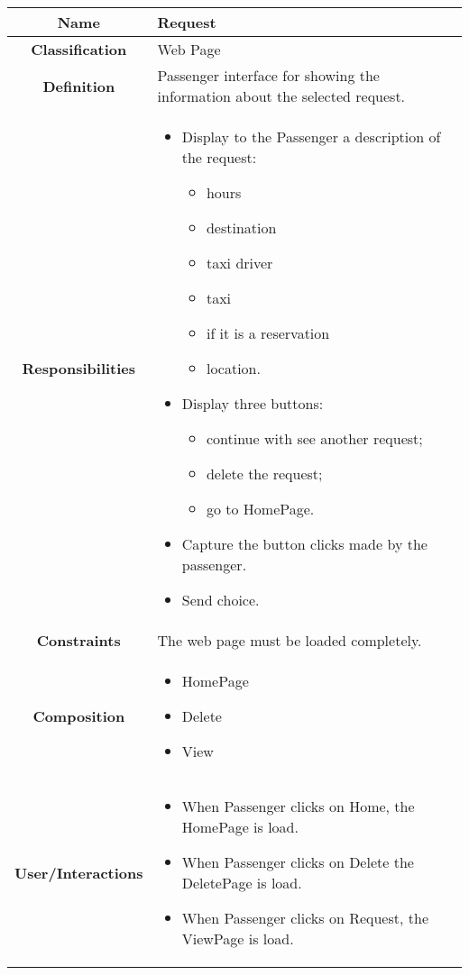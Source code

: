 \documentclass[11pt, a4paper,titlepage]{article}
\begin{document}
\begin{enumerate}
\begin{tabularx}{\textwidth}{| c | X |}
	\hline
	\textbf{Name} & 
	Request
	
	\\
	\hline
	\textbf{Classification} & 
	Web Page

	\\
	\hline
	\textbf{Definition} & 
	Passenger interface for showing the information about the selected request.

	\\
	\hline
	\textbf{Responsibilities} &
		\begin{itemize}
			\item Display to the Passenger a description of the request:
				\begin{itemize}
					\item hours
					\item destination
					\item taxi driver
					\item taxi 
					\item if it is a reservation 
					\item location.
				\end{itemize}
			\item Display three buttons:
			\begin{itemize}	
				\item continue with see another request;
				\item delete the request;
				\item go to HomePage.
			\end{itemize}
			\item Capture the button clicks made by the passenger.    
			\item Send choice.
		\end{itemize}
	
	\\
	\hline
	\textbf{Constraints} & 
	The web page must be loaded completely.
	
	\\
	\hline
	\textbf{Composition} & 
		\begin{itemize}
			\item HomePage
			\item Delete
			\item View
		\end{itemize}
	
	\\
	\hline
	\textbf{User/Interactions} & 
		\begin{itemize}
			\item When Passenger clicks on Home, the HomePage is load.        
			\item When Passenger clicks on Delete the DeletePage is load.        
			\item When Passenger clicks on Request, the ViewPage is load.
		\end{itemize}


\end{tabularx}
\end{enumerate}
\end{document}
